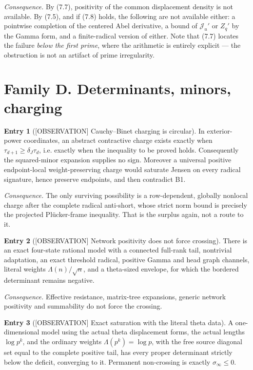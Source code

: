 \documentclass[11pt]{amsart}
\theoremstyle{definition}
\newcounter{family}
\newtheorem{entry}{Entry}[family]
\theoremstyle{remark}
\newcommand{\OBS}{\textup{[OBSERVATION]}}
\begin{document}
\emph{Consequence.} By (7.7), positivity of the common displacement
density is not available.  By (7.5), and if (7.8) holds, the following are
not available either: a pointwise completion of the centered Abel
derivative, a bound of \(\mathcal J_u'\) or \(Z_q'\) by the Gamma form,
and a finite-radical version of either.  Note that (7.7)
locates the failure \emph{below the first prime}, where the arithmetic is
entirely explicit --- the obstruction is not an artifact of prime
irregularity.

\section{Family D. Determinants, minors, charging}

\begin{entry}[\OBS{} Cauchy--Binet charging is circular]
\label{ent:D1}
In exterior-power coordinates, an abstract contractive charge exists
exactly when \(\tau_{d+1}\ge\delta_J\tau_d\), i.e. exactly when the
inequality to be proved holds.  Consequently the squared-minor expansion
supplies no sign.  Moreover a universal positive endpoint-local
weight-preserving charge would saturate Jensen on every radical signature,
hence preserve endpoints, and then contradict B1.
\end{entry}

\emph{Consequence.} The only surviving possibility is a row-dependent,
globally nonlocal charge after the complete radical anti-short, whose
strict norm bound is precisely the projected Pl\"ucker-frame inequality.
That is the surplus again, not a route to it.

\begin{entry}[\OBS{} Network positivity does not force crossing]
\label{ent:D2}
There is an exact four-state rational model with a connected full-rank
tail, nontrivial adaptation, an exact threshold radical, positive Gamma
and head graph channels, literal weights \(\Lambda(n)/\sqrt n\), and a
theta-sized envelope, for which the bordered determinant remains negative.
\end{entry}

\emph{Consequence.} Effective resistance, matrix-tree expansions, generic
network positivity and summability do not force the crossing.

\begin{entry}[\OBS{} Exact saturation with the literal theta data]
\label{ent:D3}
A one-dimensional model using the actual theta displacement forms, the
actual lengths \(\log p^k\), and the ordinary weights
\(\Lambda(p^k)=\log p\), with the free source diagonal set equal to the
complete positive tail, has every proper determinant strictly below the
deficit, converging to it.  Permanent non-crossing is exactly
\(\sigma_\infty\le0\).
\end{entry}
\end{document}
